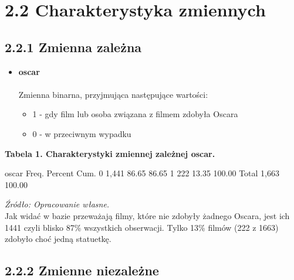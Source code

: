 \section*{2.2 Charakterystyka zmiennych}
\vspace{0.5cm}

\subsection*{2.2.1 Zmienna zależna}
\vspace{0.5cm}

\begin{itemize}
	\item[\ding{228}]\textbf{oscar} \\ 
	\\Zmienna binarna, przyjmująca następujące wartości:
  	\begin{itemize}
  	\item[]1 - gdy film lub osoba związana z filmem zdobyła Oscara
  	\item[]0 - w przeciwnym wypadku
  	\end{itemize}
\end{itemize}

\vspace{0.4cm}
{\centering
\textbf{Tabela 1. Charakterystyki zmiennej zależnej oscar.}}
\begin{stlog}

      oscar {\VBAR}      Freq.     Percent        Cum.
          0 {\VBAR}      1,441       86.65       86.65
          1 {\VBAR}        222       13.35      100.00
      Total {\VBAR}      1,663      100.00
{\smallskip}

\end{stlog}

\textit{\footnotesize{Źródło: Opracowanie własne.}} \\

Jak widać w bazie przeważają filmy, które nie zdobyły żadnego Oscara, jest ich 1441 czyli blisko 87\% wszystkich obserwacji. Tylko 13\% filmów (222 z 1663) zdobyło choć jedną statuetkę. 

\subsection*{2.2.2 Zmienne niezależne}
\vspace{0.5cm}

